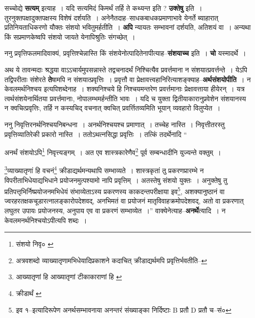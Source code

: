 \documentclass[article,12pt,a4paper]{memoir}
\begin{document}
	  \pstart सच्चोद्ये \textbf{सत्यम्} इत्याह । यदि सत्यमिदं किमर्थं तर्हि \leavevmode{} ते कथ्यन्त इति ? \textbf{उक्तेषु} इति । तुरनुक्तपक्षादुक्तपक्षस्य विशेषं दर्शयति । अनेनैतदाह--साधकबाधकप्रमाणाभावे येनर्ते ब्याहारात् प्रतिनियताधिकरणो यौक्तः संशयो भवितुमर्हतीति । \textbf{अपि} न्यायतः सम्भावनां दर्शयति, अतिशयं वा । अन्यथा किं सप्रमाणकेष्वपि संशयो जायते येनापिश्रुतिः संगच्छेत् ।
	\pend
      

	  \pstart ननु प्रवृत्तिफलमादिवाक्यं, प्रवृत्तिश्चेन्नास्ति किं संशयेनोत्पादितेनापीत्याह--\textbf{संशयाच्च} इति । \textbf{चो} यस्मादर्थे ।
	\pend
      

	  \pstart अथ ये तावन्मदाः श्रद्धया वाऽऽचार्यमुपसन्नास्ते तद्वचनादर्थं निश्चित्यैव प्रवर्त्तमाना न संशयात्प्रवर्त्तन्ते । येऽपि तद्विपरीताः संशेरते \textbf{ते}षामपि न संशयात्प्रवृत्तिः । प्रवृत्तौ वा प्रेक्षावत्त्वहानिरित्याशङ्क्याह--\textbf{अर्थसंशयोपीति} । न केवलमर्थनिश्चय इत्यपिशब्देनाह । शक्यनिश्चये हि निश्चयमन्तरेण प्रवर्त्तमानाः प्रेक्षावत्ताया हीयेरन् । यत्र त्वर्थसंशयेनार्थितया प्रवर्त्तमानाः, नोपालम्भमर्हन्तीति भावः । यदि च युक्ता द्वितीयाकारानुप्रवेशेन संशयानस्य न क्वचित्प्रवृत्तिः, तर्हि न कस्यचिद् वचनात् क्वचित् प्रवर्त्तितव्यमिति भूयान् व्यवहारो विलुप्येत ।
	\pend
      

	  \pstart ननु निवृत्तिरनर्थनिश्चयनिबन्धना । अनर्थनिश्चयश्च प्रमाणात् । तच्चेह नास्ति । निवृत्तीतरस्तु प्रवृत्तिव्यातिरेकी प्रकारो नास्ति । ततोऽथत्नसिद्धा प्रवृत्तिः । तत्किं तदर्थेनादि \leavevmode{} “
	  
	अनर्थं संशयोऽपि\footnote{संशयो निवृ० \cite{dp-msA} \cite{dp-edP} \cite{dp-edH} \cite{dp-edE} \cite{dp-edN}} निवृत्त्यङ्गम् । अत एव शास्त्रकारेणैव\footnote{अत्रवशब्दो व्याख्यातृणामभिधेयादिप्रकाशने कदाचित् क्रीडाद्यर्थमपि प्रवृत्तिर्भवतीति--\cite{dp-msD-n}} पूर्व सम्बन्धादीनि युज्यन्ते वक्तुम् । 
	  
	\footnote{आख्यातृणां हि \cite{dp-edE} \cite{dp-edN} आख्यातृणां टीकाकाराणां हि \cite{dp-msB}}\-व्याख्यातृणां हि वचनं\footnote{क्रीडार्थं \cite{dp-msA} \cite{dp-edP} \cite{dp-edE}} क्रीडाद्यर्थमन्यथापि सम्भाव्यते । शास्त्रकृतां तु प्रकरणप्रारम्भे न विपरीताभिधेयाद्यभिधाने प्रयोजनमुत्पश्यामो नापि प्रवृत्तिम् । अतस्तेषु संशयो युक्तः । अनुक्तेषु तु प्रतिपत्तृभिर्निष्प्रयोजनमभिधेयं संभाव्येताऽस्य प्रकरणस्य काकदन्तपरीक्षाया इव\footnote{इव १--इत्यादिरूपेण अनर्थसम्भावनाया अनन्तरं संख्याङ्का निर्दिष्टाः B प्रतौ D प्रतौ च--सं०}\-, अशक्यानुष्ठानं वा ज्वरहरतक्षकचूडारत्नालङ्कारोपदेशवद्, अनभिमतं वा प्रयोजनं मातृविवाहक्रमोपदेशवद्, अतो वा प्रकरणात् लघुतर उपायः प्रयोजनस्य, अनुपाय एव वा प्रकरणं सम्भाव्येत ।” वाक्येनेत्याह--\textbf{अनर्थे}त्यादि । न केवलमनर्थनिश्चयोऽपीत्यपि शब्दः ।
	\pend
      
\end{document}
